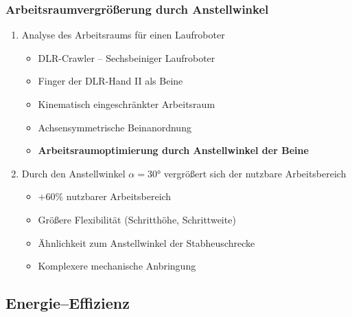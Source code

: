 \subsubsection{Arbeitsraumvergrößerung durch Anstellwinkel}
\begin{enumerate}
	\item Analyse des Arbeitsraums für einen Laufroboter
	\begin{itemize}
		\item DLR-Crawler -- Sechsbeiniger Laufroboter
		\item Finger der DLR-Hand II als Beine
		\item Kinematisch eingeschränkter Arbeitsraum
		\item Achsensymmetrische Beinanordnung
		\item \textbf{Arbeitsraumoptimierung durch Anstellwinkel der Beine}
	\end{itemize}
	\item Durch den Anstellwinkel $\alpha = 30°$ vergrößert sich der nutzbare Arbeitsbereich
	\begin{itemize}
		\item $+60\%$ nutzbarer Arbeitsbereich
		\item Größere Flexibilität (Schritthöhe, Schrittweite)
		\item Ähnlichkeit zum Anstellwinkel der Stabheuschrecke
		\item Komplexere mechanische Anbringung
	\end{itemize}
\end{enumerate}


\subsection{Energie--Effizienz}

